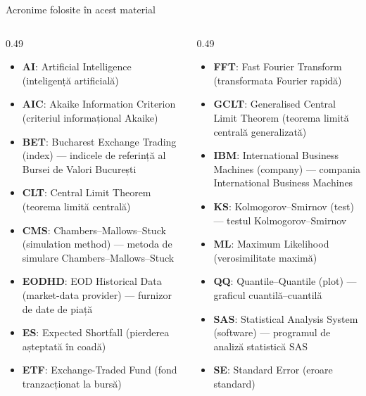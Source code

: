 {
\begin{frame}[noframenumbering]
    \titlepage
\end{frame}
}
\begin{frame}{Acronime folosite în acest material}
\begin{columns}[T]
\begin{column}{0.49\textwidth}
\begin{itemize}\setlength{\itemsep}{0pt}
    \item \textbf{AI}: Artificial Intelligence (inteligență artificială)
    \item \textbf{AIC}: Akaike Information Criterion (criteriul informațional Akaike)
    \item \textbf{BET}: Bucharest Exchange Trading (index) — indicele de referință al Bursei de Valori București
    \item \textbf{CLT}: Central Limit Theorem (teorema limită centrală)
    \item \textbf{CMS}: Chambers–Mallows–Stuck (simulation method) — metoda de simulare Chambers–Mallows–Stuck
    \item \textbf{EODHD}: EOD Historical Data (market-data provider) — furnizor de date de piață
    \item \textbf{ES}: Expected Shortfall (pierderea așteptată în coadă)
    \item \textbf{ETF}: Exchange-Traded Fund (fond tranzacționat la bursă)
\end{itemize}
\end{column}
\begin{column}{0.49\textwidth}
\begin{itemize}\setlength{\itemsep}{0pt}
    \item \textbf{FFT}: Fast Fourier Transform (transformata Fourier rapidă)
    \item \textbf{GCLT}: Generalised Central Limit Theorem (teorema limită centrală generalizată)
    \item \textbf{IBM}: International Business Machines (company) — compania International Business Machines
    \item \textbf{KS}: Kolmogorov–Smirnov (test) — testul Kolmogorov–Smirnov
    \item \textbf{ML}: Maximum Likelihood (verosimilitate maximă)
    \item \textbf{QQ}: Quantile–Quantile (plot) — graficul cuantilă–cuantilă
    \item \textbf{SAS}: Statistical Analysis System (software) — programul de analiză statistică SAS
    \item \textbf{SE}: Standard Error (eroare standard)
\end{itemize}
\end{column}
\end{columns}
\end{frame}

